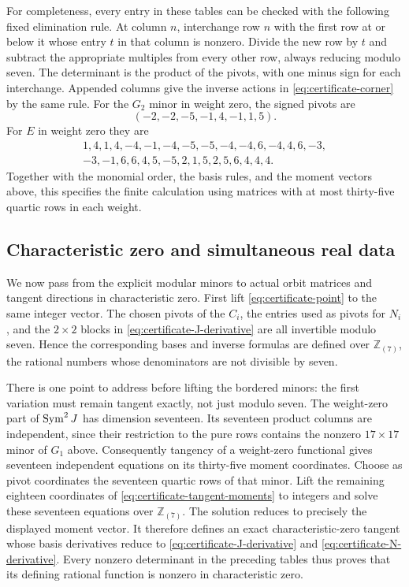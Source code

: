 For completeness, every entry in these tables can be checked with
the following fixed elimination rule.  At column $n$, interchange
row $n$ with the first row at or below it whose entry $t$ in that
column is nonzero.  Divide the new row by $t$ and subtract the
appropriate multiples from every other row, always reducing modulo
seven.  The determinant is the product of the pivots, with one
minus sign for each interchange.  Appended columns give the
inverse actions in \eqref{eq:certificate-corner} by the same rule.
For the $G_2$ minor in weight zero, the signed pivots are
\[
 (-2,-2,-5,-1,4,-1,1,5).
\]
For $E$ in weight zero they are
\begin{equation}
\begin{gathered}
 1,4,1,4,-4,-1,-4,-5,-5,-4,-4,6,-4,4,6,-3,\\
 -3,-1,6,6,4,5,-5,2,1,5,2,5,6,4,4,4.
\end{gathered}
\label{eq:certificate-pivot-example}
\end{equation}
Together with the monomial order, the basis rules, and the moment
vectors above, this specifies the finite calculation using matrices
with at most thirty-five quartic rows in each weight.

\subsection{Characteristic zero and simultaneous real data}
\label{subsec:certificate-lifting}

We now pass from the explicit modular minors to actual orbit
matrices and tangent directions in characteristic zero.  First lift
\eqref{eq:certificate-point} to the same integer vector.  The chosen
pivots of the $C_i$, the entries used as pivots for $N_i$, and the
$2\times2$ blocks in
\eqref{eq:certificate-J-derivative} are all invertible modulo seven.
Hence the corresponding bases and inverse formulas are defined over
$\mathbb Z_{(7)}$, the rational numbers whose denominators are not
divisible by seven.

There is one point to address before lifting the bordered minors:
the first variation must remain tangent exactly, not just modulo
seven.  The weight-zero part of $\operatorname{Sym}^2J$ has dimension seventeen.
Its seventeen product columns are independent, since their
restriction to the pure rows contains the nonzero $17\times17$
minor of $G_1$ above.  Consequently tangency of a weight-zero
functional gives seventeen independent equations on its thirty-five
moment coordinates.  Choose as pivot coordinates the seventeen
quartic rows of that minor.  Lift the remaining eighteen coordinates
of \eqref{eq:certificate-tangent-moments} to integers and solve
these seventeen equations over $\mathbb Z_{(7)}$.  The solution
reduces to precisely the displayed moment vector.  It therefore
defines an exact characteristic-zero tangent whose basis
derivatives reduce to
\eqref{eq:certificate-J-derivative} and
\eqref{eq:certificate-N-derivative}.  Every nonzero determinant in
the preceding tables thus proves that its defining rational
function is nonzero in characteristic zero.

